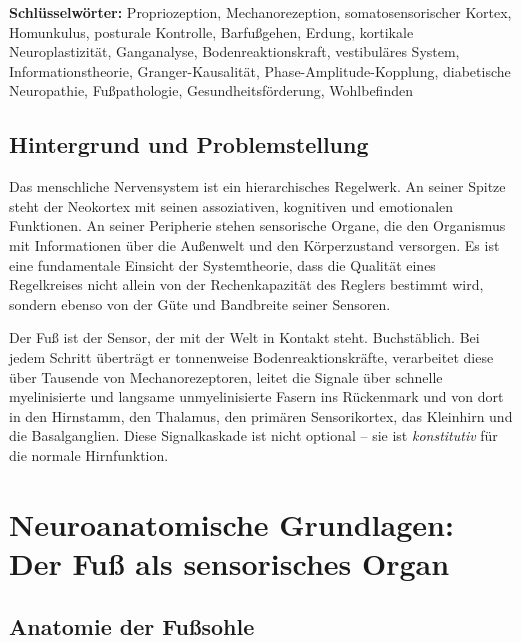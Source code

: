 ﻿\documentclass[12pt,a4paper]{report}
\theoremstyle{plain}
\theoremstyle{definition}
\theoremstyle{remark}
\begin{document}
\textbf{Schlüsselwörter:}
Propriozeption, Mechanorezeption, somatosensorischer Kortex, Homunkulus,
posturale Kontrolle, Barfußgehen, Erdung, kortikale Neuroplastizität,
Ganganalyse, Bodenreaktionskraft, vestibuläres System, Informationstheorie,
Granger-Kausalität, Phase-Amplitude-Kopplung, diabetische Neuropathie,
Fußpathologie, Gesundheitsförderung, Wohlbefinden

\section{Hintergrund und Problemstellung}

Das menschliche Nervensystem ist ein hierarchisches Regelwerk. An seiner
Spitze steht der Neokortex mit seinen assoziativen, kognitiven und emotionalen
Funktionen. An seiner Peripherie stehen sensorische Organe, die den Organismus
mit Informationen über die Außenwelt und den Körperzustand versorgen. Es ist
eine fundamentale Einsicht der Systemtheorie, dass die Qualität eines
Regelkreises nicht allein von der Rechenkapazität des Reglers bestimmt wird,
sondern ebenso von der Güte und Bandbreite seiner Sensoren.

Der Fuß ist der Sensor, der mit der Welt in Kontakt steht. Buchstäblich.
Bei jedem Schritt überträgt er tonnenweise Bodenreaktionskräfte, verarbeitet
diese über Tausende von Mechanorezeptoren, leitet die Signale über schnelle
myelinisierte und langsame unmyelinisierte Fasern ins Rückenmark und von dort
in den Hirnstamm, den Thalamus, den primären Sensorikortex, das Kleinhirn
und die Basalganglien. Diese Signalkaskade ist nicht optional -- sie ist
\emph{konstitutiv} für die normale Hirnfunktion.

\chapter{Neuroanatomische Grundlagen: Der Fuß als sensorisches Organ}

\section{Anatomie der Fußsohle}
\end{document}
